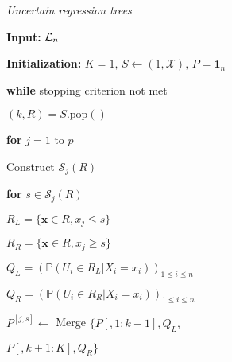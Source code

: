 \documentclass[twoside,11pt]{article}
\begin{document}
\begin{algorithm}
{\textit{Uncertain regression trees}}

    \noindent \textbf{Input:}     ${\cal L}_n$ 
    
    \noindent\textbf{Initialization:} $K=1, \, S \leftarrow (1,\mathcal{X}), \, P = \mathbf{1}_n$
    
    \noindent\textbf{while} stopping criterion not met
    
            $(k, R) = S.\text{pop}()$
            
            \textbf{for} $j = 1 \text{ to } p$
            
            \hspace{\parindent} Construct $\mathcal{S}_j(R)$ 
            
            \hspace{\parindent} \textbf{for} $ s \in \mathcal{S}_j(R)$
            
            \hspace{\parindent} \hspace{\parindent} $R_L = \{\boldsymbol{x} \in R, x_j \leq s\}$
            
            \hspace{\parindent} \hspace{\parindent} $R_R = \{\boldsymbol{x} \in R, x_j \geq s\}$
            
            \hspace{\parindent} \hspace{\parindent} $Q_L = (\mathbb{P}(U_i \in R_L|X_i = x_i))_{1\leq i \leq n}$ 
              
            \hspace{\parindent} \hspace{\parindent} $Q_R = (\mathbb{P}(U_i \in R_R|X_i = x_i))_{1\leq i \leq n}$
            
            \hspace{\parindent} \hspace{\parindent}$P^{[j,s]} \leftarrow$ Merge $\{ P[, 1:k-1], Q_L, $
            
             \hspace{\parindent} \hspace{\parindent}\hspace{\parindent} \hspace{\parindent} \hspace{\parindent} \hspace{\parindent} $P[, k+1:K], Q_R \} $
            

\end{algorithm}
\end{document}
